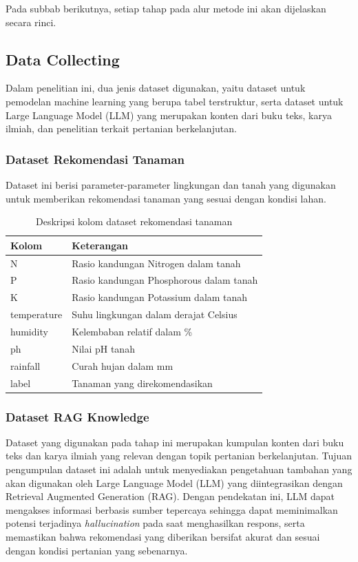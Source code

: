 \documentclass{article} %
\begin{document}
Pada subbab berikutnya, setiap tahap pada alur metode ini akan dijelaskan secara rinci.

\subsection{Data Collecting}
Dalam penelitian ini, dua jenis dataset digunakan, yaitu dataset untuk pemodelan machine learning yang berupa tabel terstruktur, serta dataset untuk Large Language Model (LLM) yang merupakan konten dari buku teks, karya ilmiah, dan penelitian terkait pertanian berkelanjutan.

\subsubsection{Dataset Rekomendasi Tanaman}
Dataset ini berisi parameter-parameter lingkungan dan tanah yang digunakan untuk memberikan rekomendasi tanaman yang sesuai dengan kondisi lahan.

\begin{table}[H]
    \centering
    \caption{Deskripsi kolom dataset rekomendasi tanaman}
    \begin{tabular}{ll}
        \toprule
        \textbf{Kolom} & \textbf{Keterangan} \\
        \midrule
        N & Rasio kandungan Nitrogen dalam tanah \\
        P & Rasio kandungan Phosphorous dalam tanah \\
        K & Rasio kandungan Potassium dalam tanah \\
        temperature & Suhu lingkungan dalam derajat Celsius \\
        humidity & Kelembaban relatif dalam \% \\
        ph & Nilai pH tanah \\
        rainfall & Curah hujan dalam mm \\
        label & Tanaman yang direkomendasikan \\
        \bottomrule
    \end{tabular}
    \label{tab:dataset_rekomendasi_tanaman}
\end{table}


\subsubsection{Dataset RAG Knowledge}
Dataset yang digunakan pada tahap ini merupakan kumpulan konten dari buku teks dan karya ilmiah yang relevan dengan topik pertanian berkelanjutan. Tujuan pengumpulan dataset ini adalah untuk menyediakan pengetahuan tambahan yang akan digunakan oleh Large Language Model (LLM) yang diintegrasikan dengan Retrieval Augmented Generation (RAG). Dengan pendekatan ini, LLM dapat mengakses informasi berbasis sumber tepercaya sehingga dapat meminimalkan potensi terjadinya \textit{hallucination} pada saat menghasilkan respons, serta memastikan bahwa rekomendasi yang diberikan bersifat akurat dan sesuai dengan kondisi pertanian yang sebenarnya.
\end{document}
